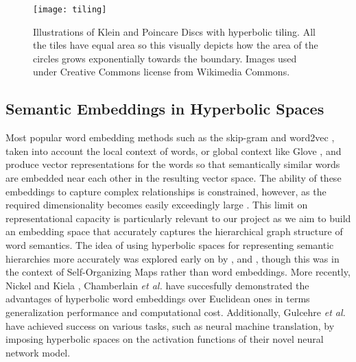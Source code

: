 \documentclass[12pt]{report}
\begin{document}
\begin{figure}
  \centering
	\texttt{[image: tiling]}
	\caption{Illustrations of Klein and Poincare Discs with hyperbolic tiling. All the tiles have equal area so this visually depicts how the area of the circles grows exponentially towards the boundary. Images used under Creative Commons license from Wikimedia Commons.}
	\label{fig:hyspace}
\end{figure}

\subsection{Semantic Embeddings in Hyperbolic Spaces}
Most popular word embedding methods such as the skip-gram and word2vec \cite{Mikolov2013}, \cite{Mikolov} taken into account the local context of words, or global context like Glove \cite{Pennington2014}, and produce vector representations for the words so that semantically similar words are embedded near each other in the resulting vector space. The ability of these embeddings to capture complex relationships is constrained, however, as the required dimensionality becomes easily exceedingly large \cite{Nickel2017} \cite{Chamberlain2017} \cite{Nickel2018}. This limit on representational capacity is particularly relevant to our project as we aim to build an embedding space that accurately captures the hierarchical graph structure of word semantics. The idea of using hyperbolic spaces for representing semantic hierarchies more accurately was explored early on by \cite{Ritter1999}, \cite{Ontrup2002} and \cite{Walter2006}, though this was in the context of Self-Organizing Maps rather than word embeddings. More recently, Nickel and Kiela \cite{Nickel2017}, Chamberlain \textit{et al.} \cite{Chamberlain2017} have succesfully demonstrated the advantages of hyperbolic word embeddings over Euclidean ones in terms generalization performance and computational cost. Additionally, Gulcehre \textit{et al.} \cite{Gulcehre2018} have achieved success on various tasks, such as neural machine translation, by imposing hyperbolic spaces on the activation functions of their novel neural network model.
\end{document}
